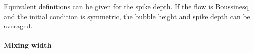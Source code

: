Equivalent definitions can be given for the spike depth.
If the flow is Boussinesq and the initial condition is symmetric, the bubble height and spike depth can be averaged.

\paragraph{Mixing width}



\begin{comment}
\section{Stages}

\subsection{Linear growth} 
When the amplitude of the surface perturbation is small compared to its wave-length, the perturbation grows exponentially.
The growth rate is seen to depend on the forcing, wave-length, viscosity, diffusivity, and interface thickness.
This stage can be treated with linear and weakly-nonlinear theories, as discussed further in \sref{linear}.


\subsection{Single-mode stagnation}
As the growing Rayleigh-Taylor modes saturate, the acceleration of the bubble tip decreases.
The stagnation stage of the single-mode Rayleigh-Taylor instability is defined as a stage of the flow that exhibits nearly constant bubble velocity.
It had been believed that the first such stage was terminal, i.e. steady state.
It has recently been shown, via both simulation~\cite{Ramaprabhu2006} and experiment~\cite{Wilkinson2007}, that at low Atwood number and high Reynolds number the flow continues to develop into re-acceleration stage.
For this reason, the nearly constant velocity is termed the \textit{stagnation velocity}.
The primary observable of a stagnation stage is the stagnation velocity, but there is secondary interest in the velocity profile through the transition from the weakly non-linear to stagnation stages and in the bubble height at which stagnation velocity is reached.


\end{comment}
